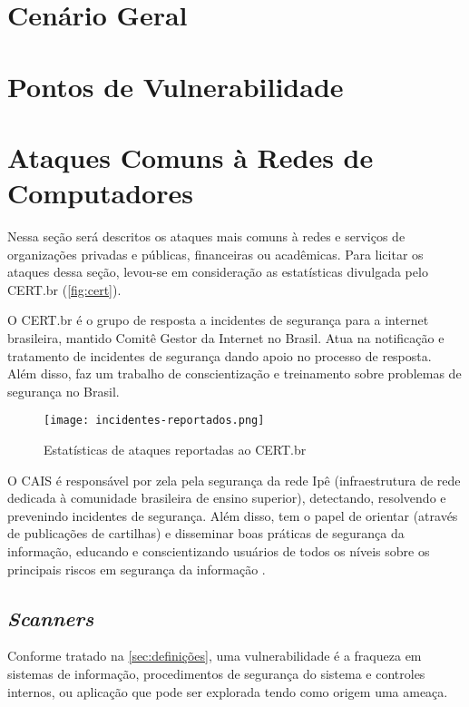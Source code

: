 \section{Cenário Geral} \label{sec:cenario-geral}
\section{Pontos de Vulnerabilidade} \label{sec:pontos-vulnerabilidade}
\section{Ataques Comuns à Redes de Computadores} \label{sec:ataques-comuns}

Nessa seção será descritos os ataques mais comuns à redes e serviços de organizações privadas e públicas, financeiras ou acadêmicas. Para licitar os ataques dessa seção, levou-se em consideração as estatísticas divulgada pelo CERT.br (\autoref{fig:cert}).

O CERT.br é o grupo de resposta a incidentes de segurança para a internet brasileira, mantido Comitê Gestor da Internet no Brasil. Atua na notificação e tratamento de incidentes de segurança dando apoio no processo de resposta. Além disso, faz um trabalho de conscientização e treinamento sobre problemas de segurança no Brasil. 

\begin{figure}[htb]
 \centering
 \caption{Estatísticas de ataques reportadas ao CERT.br}
 \texttt{[image: incidentes-reportados.png]}
 \label{fig:cert}
\end{figure}

O CAIS é responsável por zela pela segurança da rede Ipê (infraestrutura de rede dedicada à comunidade brasileira de ensino superior), detectando, resolvendo e prevenindo incidentes de segurança. Além disso, tem o papel de orientar (através de publicações de cartilhas) e disseminar boas práticas de segurança da informação, educando e conscientizando usuários de todos os níveis sobre os principais riscos em segurança da informação \cite{cais}.

\subsection{\textit{Scanners}} \label{sec:varredura}

Conforme tratado na \autoref{sec:definições}, uma vulnerabilidade é a fraqueza em sistemas de informação, procedimentos de segurança do sistema e controles internos, ou aplicação que pode ser explorada tendo como origem uma ameaça. 

